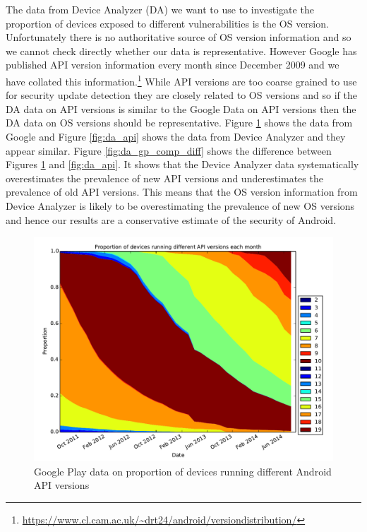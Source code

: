 \documentclass[conference,a4paper,twoside]{IEEEtran}
\begin{document}
The data from Device Analyzer (DA) we want to use to investigate the proportion of devices exposed to different vulnerabilities is the OS version.
Unfortunately there is no authoritative source of OS version information and so we cannot check directly whether our data is representative.
However Google has published API version information every month since December 2009 and we have collated this information.\footnote{\url{https://www.cl.cam.ac.uk/~drt24/android/versiondistribution/}}
While API versions are too coarse grained to use for security update detection they are closely related to OS versions and so if the DA data on API versions is similar to the Google Data on API versions then the DA data on OS versions should be representative.
Figure \ref{fig:play_api} shows the data from Google and Figure \ref{fig:da_api} shows the data from Device Analyzer and they appear similar.
Figure \ref{fig:da_gp_comp_diff} shows the difference between Figures \ref{fig:play_api} and \ref{fig:da_api}.
It shows that the Device Analyzer data systematically overestimates the prevalence of new API versions and underestimates the prevalence of old API versions.
This means that the OS version information from Device Analyzer is likely to be overestimating the prevalence of new OS versions and hence our results are a conservative estimate of the security of Android.
\begin{figure}
 \centering
 \includegraphics[width=\columnwidth]{figures/googleplayapi}
 \caption{Google Play data on proportion of devices running different Android API versions}
 \label{fig:play_api}
\end{figure}
\end{document}
